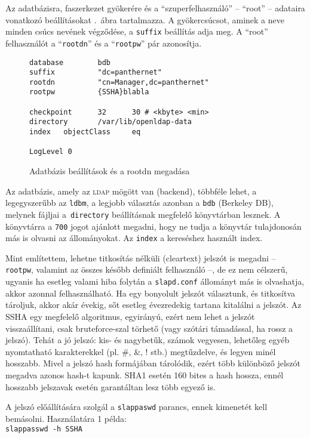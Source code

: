 Az adatbázisra,  faszerkezet gyökerére és a ``szuperfelhasználó'' -- ``root'' -- adataira vonatkozó beállításokat
.\ ábra tartalmazza. A gyökercsúcsot, aminek a neve minden csúcs nevének végződése, a
\texttt{suffix} beállítás adja meg. A ``root'' felhasználót a ``\texttt{rootdn}'' és a ``\texttt{rootpw}'' pár
azonosítja. 

\begin{figure}
\begin{Verbatim}[frame=single]
database        bdb
suffix          "dc=panthernet"
rootdn          "cn=Manager,dc=panthernet"
rootpw          {SSHA}blabla

checkpoint      32      30 # <kbyte> <min>
directory       /var/lib/openldap-data
index   objectClass     eq

LogLevel 0
\end{Verbatim}
  \caption{Adatbázis beállítások és a rootdn megadása}
  \label{fig:ldap-db}
\end{figure}

Az adatbázis, amely az \textsc{ldap} mögött van (backend), többféle lehet, a legegyszerűbb az
\texttt{ldbm}, a legjobb választás azonban a  \texttt{bdb} (Berkeley DB), melynek fájljai a~\texttt{directory}
beállításnak megfelelő könyvtárban lesznek. A könyvtárra a \texttt{700} jogot ajánlott megadni, hogy ne tudja a
könyvtár tulajdonosán más is olvasni az állományokat. Az  \texttt{index} a  kereséshez használt index.


Mint említettem, lehetne titkosítás nélküli (cleartext) jelszót is megadni -- \texttt{rootpw}, valamint az összes később
definiált felhasználó --, de ez nem célszerű, ugyanis ha esetleg valami hiba folytán a \texttt{slapd.conf} állományt más
is olvashatja, akkor azonnal felhasználható. Ha egy bonyolult jelszót választunk, és titkosítva tároljuk, akkor akár
évekig, sőt esetleg évezredekig tartana kitalálni a jelszót. Az \textsc{SSHA} egy megfelelő algoritmus, egyirányú, ezért
nem lehet a jelszót visszaállítani, csak bruteforce-szal törhető (vagy szótári támadással, ha rossz a jelszó). Tehát a
jó jelszó: kis-  és nagybetűk, számok vegyesen, lehetőleg egyéb nyomtatható karakterekkel (pl. \#, \&, ! stb.)
megtűzdelve, és legyen minél hosszabb. Mivel a jelszó hash formájában tárolódik, ezért több különböző jelszót megadva
azonos hash-t kapunk. \textsc{SHA1} esetén 160 bites a hash hossza, ennél hosszabb jelszavak esetén garantáltan lesz több
egyező is.

A jelszó előállítására szolgál a \texttt{slappaswd} parancs, ennek kimenetét kell bemásolni. Használatára 1 példa:\\
\texttt{slappasswd -h {SSHA}}

